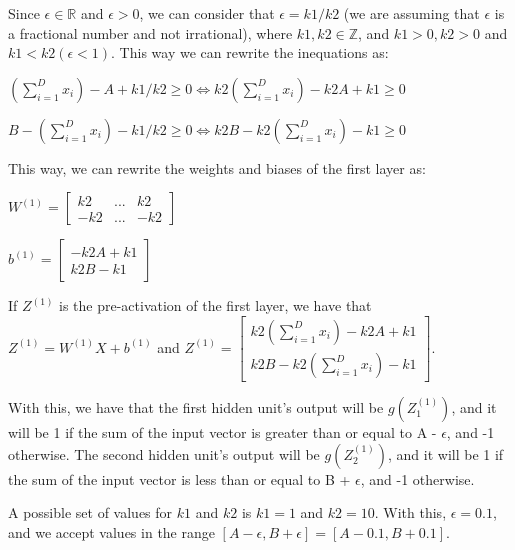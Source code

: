 \documentclass{article}
\begin{document}
\bigskip

Since $\epsilon \in \mathbb{R}$ and $\epsilon > 0$, we can consider that $\epsilon = k1/k2$ (we are assuming that $\epsilon$
is a fractional number and not irrational), where $k1, k2 \in \mathbb{Z}$, 
and $k1 > 0, k2 > 0$ and $k1 < k2 (\epsilon < 1)$. This way we can rewrite the inequations as:

\bigskip

$(\sum_{i=1}^{D} x_i) - A + k1/k2 \geq 0 \iff k2(\sum_{i=1}^{D} x_i) - k2A + k1 \geq 0$

\bigskip

$B - (\sum_{i=1}^{D} x_i) - k1/k2 \geq 0 \iff k2B - k2(\sum_{i=1}^{D} x_i) - k1 \geq 0$

\bigskip

This way, we can rewrite the weights and biases of the first layer as:

\bigskip

\( W^{(1)} = \begin{bmatrix}
    k2  & ... & k2  \\
    -k2 & ... & -k2
\end{bmatrix}
\)

\medskip

\(b^{(1)} = \begin{bmatrix}
    -k2A + k1 \\
    k2B - k1
\end{bmatrix}
\)

\bigskip

If $Z^{(1)}$ is the pre-activation of the first layer, we have that $Z^{(1)} = W^{(1)}X + b^{(1)}$ and
$Z^{(1)} = \begin{bmatrix}
    k2(\sum_{i=1}^{D} x_i) - k2A + k1\\
    k2B - k2(\sum_{i=1}^{D} x_i) - k1
\end{bmatrix}
$.

\bigskip

With this, we have that the first hidden unit's output will be $g(Z^{(1)}_1)$, and it will be 1 if the sum of the 
input vector is greater than or equal to A - $\epsilon$, and -1 otherwise. The second hidden unit's output will be $g(Z^{(1)}_2)$,
and it will be 1 if the sum of the input vector is less than or equal to B + $\epsilon$, and -1 otherwise.

A possible set of values for $k1$ and $k2$ is $k1 = 1$ and $k2 = 10$. With this, $\epsilon = 0.1$, and we accept values in
the range $[A - \epsilon, B + \epsilon] = [A - 0.1, B + 0.1]$.
\end{document}
